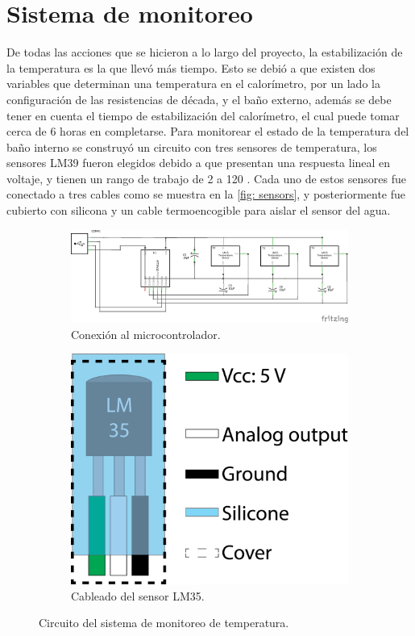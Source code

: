 	\section{Sistema de monitoreo}
	De todas las acciones que se hicieron a lo largo del proyecto, la estabilizaci\'on de la temperatura es la que llev\'o m\'as tiempo. Esto se debi\'o a que existen dos variables que determinan una temperatura en el calor\'imetro, por un lado la configuraci\'on de las resistencias de d\'ecada, y el ba\~no externo, adem\'as se debe tener en cuenta el tiempo de estabilizaci\'on del calor\'imetro, el cual puede tomar cerca de 6 horas en completarse. Para monitorear el estado de la temperatura del ba\~no interno se construy\'o un circuito con tres sensores de temperatura, los sensores LM39 fueron elegidos debido a que presentan una respuesta lineal en voltaje, y tienen un rango de trabajo de 2 \grad{} a 120 \grad{} \cite{instruments1999lm35}. Cada uno de estos sensores fue conectado a tres cables como se muestra en la \autoref{fig: sensors}, y posteriormente fue cubierto con silicona y un cable termoencogible para aislar el sensor del agua. 	
	\begin{figure}[h]
		\centering
		\begin{subfigure}{0.75\textwidth}
			\includegraphics[width=\linewidth]{Figures/Sketch_schem}
			\caption{Conexi\'on al microcontrolador.}
			\label{fig: circuito}
		\end{subfigure}
		\begin{subfigure}{0.23\textwidth}
			\includegraphics[width=\linewidth]{Figures/Sensor}
			\caption{Cableado del sensor LM35.}	
			\label{fig: sensors}
		\end{subfigure}
		\caption{Circuito del sistema de monitoreo de temperatura.}	
	\end{figure}

